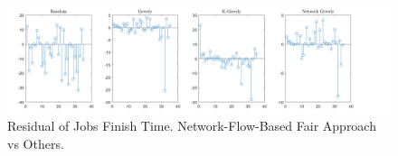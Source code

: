 \begin{figure}[htb]
\includegraphics[width=1.1\textwidth]{figure/fig-residual.png}
\centering
\caption{Residual of Jobs Finish Time. Network-Flow-Based Fair Approach vs Others.} \label{fig-residual}
\end{figure}